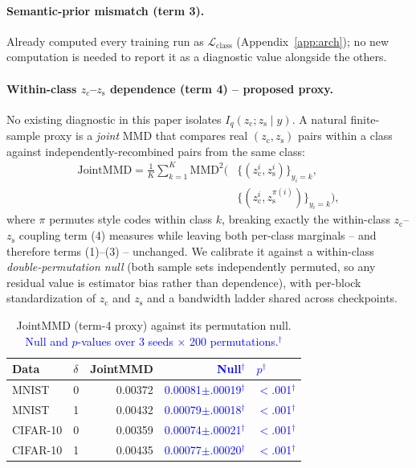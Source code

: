 \documentclass[10pt,letterpaper]{article}
\newcommand{\zc}{z_{\mathrm{c}}}
\newcommand{\zs}{z_{\mathrm{s}}}
\newcommand{\MMD}{\mathrm{MMD}}
\newcommand{\pj}[1]{\textcolor{blue}{#1$^{\dagger}$}}
\begin{document}
\paragraph{Semantic-prior mismatch (term 3).} Already computed every
training run as $\mathcal L_{\mathrm{class}}$ (Appendix~\ref{app:arch}); no
new computation is needed to report it as a diagnostic value alongside the
others.

\paragraph{Within-class $\zc$--$\zs$ dependence (term 4) -- proposed
proxy.} No existing diagnostic in this paper isolates
$I_q(\zc;\zs\mid y)$. A natural finite-sample proxy is a \emph{joint} MMD
that compares real $(\zc,\zs)$ pairs within a class against
independently-recombined pairs from the same class:
\begin{align*}
\mathrm{JointMMD} = \frac1K\sum_{k=1}^K \MMD^2\bigl(
  &\{(\zc^i,\zs^i)\}_{y_i=k},\, \\
  &\{(\zc^i,\zs^{\pi(i)})\}_{y_i=k}\bigr),
\end{align*}
where $\pi$ permutes style codes within class $k$, breaking exactly the
within-class $\zc$--$\zs$ coupling term (4) measures while leaving both
per-class marginals -- and therefore terms (1)--(3) -- unchanged. We
calibrate it against a within-class \emph{double-permutation null} (both
sample sets independently permuted, so any residual value is estimator bias
rather than dependence), with per-block standardization of $\zc$ and $\zs$
and a bandwidth ladder shared across checkpoints.

\begin{table}[h]
\centering
\small
\setlength{\tabcolsep}{4pt}
\caption{JointMMD (term-4 proxy) against its permutation null.
         \pj{Null and $p$-values over 3 seeds $\times$ 200 permutations.}}
\label{tab:jointmmd}
\begin{tabular}{llrrl}
\toprule
Data & $\delta$ & JointMMD & \pj{Null} & \pj{$p$} \\
\midrule
MNIST    & 0 & 0.00372 & \pj{0.00081$\pm$.00019} & \pj{$<$.001} \\
MNIST    & 1 & 0.00432 & \pj{0.00079$\pm$.00018} & \pj{$<$.001} \\
CIFAR-10 & 0 & 0.00359 & \pj{0.00074$\pm$.00021} & \pj{$<$.001} \\
CIFAR-10 & 1 & 0.00435 & \pj{0.00077$\pm$.00020} & \pj{$<$.001} \\
\bottomrule
\end{tabular}
\end{table}
\end{document}
